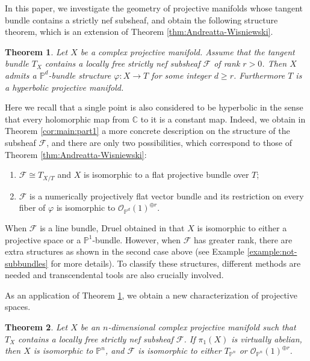 \documentclass[english,reqno]{amsart}
\newcommand\bbC{{\mathbb C}}
\newcommand\bbP{{\mathbb P}}
\newcommand\sF{{\mathscr F}}
\newcommand\sO{{\mathscr O}}
\theoremstyle{plain}
\newtheorem{thm}{Theorem}[section]
\theoremstyle{definition}
\numberwithin{equation}{section} %
\begin{document}
In this paper, we investigate the geometry of projective
manifolds whose tangent bundle contains a strictly nef subsheaf, and
obtain the following structure theorem, which is an extension of
Theorem \ref{thm:Andreatta-Wisniewski}.

\begin{thm}
    \label{thm:main-theorem}
    Let $X$ be a  complex projective manifold. Assume that the tangent bundle $T_X$ contains a locally free strictly nef subsheaf $\sF$ of rank $r>0$.
 Then $X$ admits a $\bbP^d$-bundle structure $\varphi\colon X\rightarrow T$ for some integer $d\geq r$.
 Furthermore
$T$ is a hyperbolic projective manifold.
\end{thm}


\noindent Here we recall that  a single point is also considered to be hyperbolic in the sense that every holomorphic map from $\bbC$ to it is a constant map.  Indeed,  we  obtain in Theorem \ref{cor:main:part1} a more concrete description on the
structure of the subsheaf $\sF$, and there are only two possibilities, which correspond to those of Theorem
\ref{thm:Andreatta-Wisniewski}:
    \begin{enumerate}
        \item $\sF\cong  T_{X/T}$ and $X$ is isomorphic to a flat projective bundle over
        $T$;
        \item $\sF$ is a numerically projectively flat vector bundle and its restriction  on every fiber of $\varphi$ is  isomorphic to  $\sO_{\bbP^d}(1)^{\oplus r}$.
    \end{enumerate}




\noindent  When $\sF$ is a line bundle, Druel obtained in
\cite{Druel2004} that $X$ is isomorphic to  either a projective
space or  a $\bbP^1$-bundle. However, when $\sF$ has greater rank,
 there are extra
structures as shown  in the second case above  (see Example
\ref{example:not-subbundles} for more details). To classify these structures,
 different methods are needed and  transcendental tools are
also crucially involved.

As an application of Theorem \ref{thm:main-theorem}, we obtain a  new characterization of projective spaces.

\begin{thm}
    \label{thm:simply-connected-Pn}  Let $X$ be an $n$-dimensional  complex projective manifold such that $T_X$ contains a locally free strictly nef subsheaf $\sF$.
    If $\pi_1(X)$ is virtually abelian, then $X$ is isomorphic to  $\bbP^n$, and $\sF$ is isomorphic to either $T_{\bbP^n}$ or $\sO_{\bbP^n}(1)^{\oplus r}$.
\end{thm}
\end{document}
